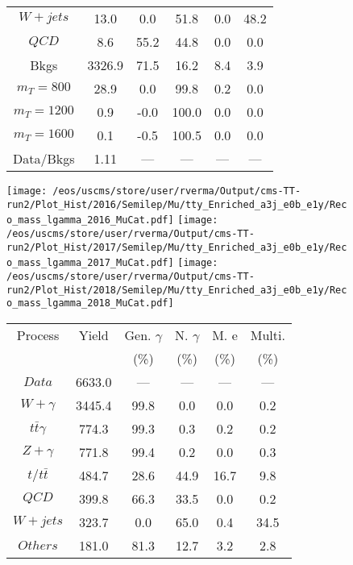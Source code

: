 \begin{figure}
\begin{minipage}[c]{0.32\textwidth}
{\begin{tabular}{cccccc}
$ W+jets $ &  13.0 &  0.0 &  51.8 &  0.0 &  48.2\\
$ QCD $ &  8.6 &  55.2 &  44.8 &  0.0 &  0.0\\
Bkgs &  3326.9 &  71.5 &  16.2 &  8.4 &  3.9\\
$ m_{T} = 800 $ &  28.9 &  0.0 &  99.8 &  0.2 &  0.0\\
$ m_{T} = 1200 $ &  0.9 &  -0.0 &  100.0 &  0.0 &  0.0\\
$ m_{T} = 1600 $ &  0.1 &  -0.5 &  100.5 &  0.0 &  0.0\\
Data/Bkgs &  1.11 &  --- &  --- &  --- &  ---\\
\hline
\end{tabular}
}
\end{minipage}
\end{figure}

\begin{figure}
\centering
\texttt{[image: /eos/uscms/store/user/rverma/Output/cms-TT-run2/Plot\_Hist/2016/Semilep/Mu/tty\_Enriched\_a3j\_e0b\_e1y/Reco\_mass\_lgamma\_2016\_MuCat.pdf]}
\texttt{[image: /eos/uscms/store/user/rverma/Output/cms-TT-run2/Plot\_Hist/2017/Semilep/Mu/tty\_Enriched\_a3j\_e0b\_e1y/Reco\_mass\_lgamma\_2017\_MuCat.pdf]}
\texttt{[image: /eos/uscms/store/user/rverma/Output/cms-TT-run2/Plot\_Hist/2018/Semilep/Mu/tty\_Enriched\_a3j\_e0b\_e1y/Reco\_mass\_lgamma\_2018\_MuCat.pdf]}
\begin{minipage}[c]{0.32\textwidth}
\centering
\tiny{
\begin{tabular}{cccccc}
\hline
Process & Yield & Gen. $\gamma$ & N. $\gamma$ & M. e & Multi. \\
 &  & (\%) & (\%) & (\%) & (\%)  \\
\hline
                                                                      $ Data $ &  6633.0 &  --- &  --- &  --- &  ---\\
$ W+\gamma $ &  3445.4 &  99.8 &  0.0 &  0.0 &  0.2\\
$ t\bar{t}\gamma $ &  774.3 &  99.3 &  0.3 &  0.2 &  0.2\\
$ Z+\gamma $ &  771.8 &  99.4 &  0.2 &  0.0 &  0.3\\
$ t/t\bar{t} $ &  484.7 &  28.6 &  44.9 &  16.7 &  9.8\\
$ QCD $ &  399.8 &  66.3 &  33.5 &  0.0 &  0.2\\
$ W+jets $ &  323.7 &  0.0 &  65.0 &  0.4 &  34.5\\
$ Others $ &  181.0 &  81.3 &  12.7 &  3.2 &  2.8\\

\end{tabular}}
\end{minipage}
\end{figure}
